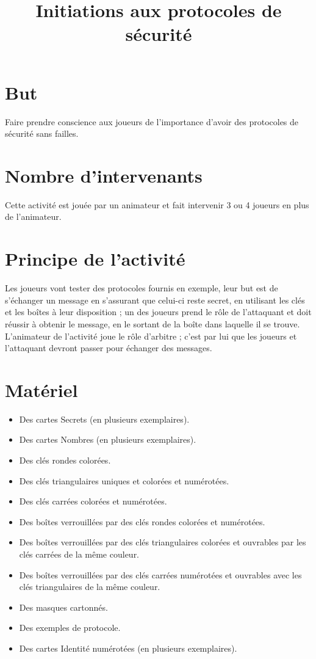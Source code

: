 \documentclass[a4paper,10pt]{article}
\title{Initiations aux protocoles de sécurité}
\begin{document}
\maketitle


\section{But}
Faire prendre conscience aux joueurs de l'importance d'avoir des protocoles de sécurité sans failles.

\section{Nombre d'intervenants}
Cette activité est jouée par un animateur et fait intervenir 3 ou 4 joueurs en plus de l'animateur.

\section{Principe de l'activité}
Les joueurs vont tester des protocoles fournis en exemple, leur but est de s'échanger un message en s'assurant que celui-ci reste secret, en utilisant les clés et les boîtes à leur disposition ; un des joueurs prend le rôle de l'attaquant et doit réussir à obtenir le message, en le sortant de la boîte dans laquelle il se trouve. L'animateur de l'activité joue le rôle d'arbitre ; c'est par lui que les joueurs et l'attaquant devront passer pour échanger des messages.

\section{Matériel}
\begin{itemize}
\item Des cartes Secrets (en plusieurs exemplaires).
\item Des cartes Nombres (en plusieurs exemplaires).
\item Des clés rondes colorées.
\item Des clés triangulaires uniques et colorées et numérotées.
\item Des clés carrées colorées et numérotées.
\item Des boîtes verrouillées par des clés rondes colorées et numérotées.
\item Des boîtes verrouillées par des clés triangulaires colorées et ouvrables par les clés carrées de la même couleur.
\item Des boîtes verrouillées par des clés carrées numérotées et ouvrables avec les clés triangulaires de la même couleur.
\item Des masques cartonnés.
\item Des exemples de protocole.
\item Des cartes Identité numérotées (en plusieurs exemplaires).
\end{itemize}
\end{document}
